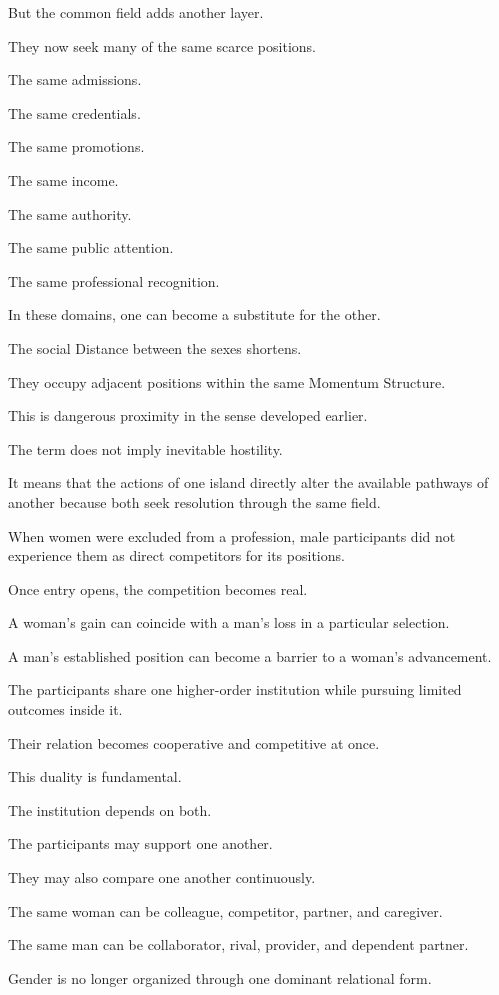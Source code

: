 But the common field adds another layer.

They now seek many of the same scarce positions.

The same admissions.

The same credentials.

The same promotions.

The same income.

The same authority.

The same public attention.

The same professional recognition.

In these domains, one can become a substitute for the other.

The social Distance between the sexes shortens.

They occupy adjacent positions within the same Momentum Structure.

This is dangerous proximity in the sense developed earlier.

The term does not imply inevitable hostility.

It means that the actions of one island directly alter the available pathways of another because both seek resolution through the same field.

When women were excluded from a profession, male participants did not experience them as direct competitors for its positions.

Once entry opens, the competition becomes real.

A woman’s gain can coincide with a man’s loss in a particular selection.

A man’s established position can become a barrier to a woman’s advancement.

The participants share one higher-order institution while pursuing limited outcomes inside it.

Their relation becomes cooperative and competitive at once.

This duality is fundamental.

The institution depends on both.

The participants may support one another.

They may also compare one another continuously.

The same woman can be colleague, competitor, partner, and caregiver.

The same man can be collaborator, rival, provider, and dependent partner.

Gender is no longer organized through one dominant relational form.

